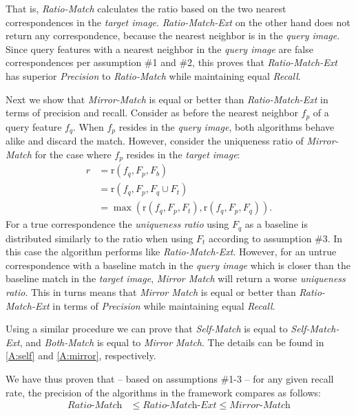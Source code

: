 \documentclass[review]{elsarticle}
\begin{document}
That is, \emph{Ratio-Match} calculates the ratio based on the two nearest correspondences in the \emph{target image}. \emph{Ratio-Match-Ext} on the other hand does not return any correspondence, because the nearest neighbor is in the \emph{query image}. Since query features with a nearest neighbor in the \emph{query image} are false correspondences per assumption \#1 and \#2, this proves that \emph{Ratio-Match-Ext} has superior \emph{Precision} to \emph{Ratio-Match} while maintaining equal \emph{Recall}.

Next we show that \emph{Mirror-Match} is equal or better than \emph{Ratio-Match-Ext} in terms of precision and recall. Consider as before the nearest neighbor $f_{p}$ of a query feature $f_{q}$. When $f_{p}$ resides in the \emph{query image}, both algorithms behave alike and discard the match.  However, consider the uniqueness ratio of \emph{Mirror-Match} for the case where $f_{p}$ resides in the \emph{target image}:
\begin{align*}
    r &= \text{r}(f_{q}, F_{p}, F_{b}) \\
        &= \text{r}(f_{q}, F_{p}, F_{q} \cup F_{t})\\
        &= \max( \text{r}(f_{q}, F_{p}, F_{t}), 
    \text{r}(f_{q}, F_{p}, F_{q}) ).
\end{align*}
For a true correspondence the \emph{uniqueness ratio} using $F_{q}$ as a baseline is distributed similarly to the ratio when using $F_{t}$ according to assumption \#3. In this case the algorithm performs like \emph{Ratio-Match-Ext}.  However, for an untrue correspondence with a baseline match in the \emph{query image} which is closer than the baseline match in the \emph{target image}, \emph{Mirror Match} will return a worse \emph{uniqueness ratio}. This in turns means that \emph{Mirror Match} is equal or better than \emph{Ratio-Match-Ext} in terms of  \emph{Precision} while maintaining equal \emph{Recall}.

Using a similar procedure we can prove that \emph{Self-Match} is equal to \emph{Self-Match-Ext}, and \emph{Both-Match} is equal to \emph{Mirror Match}.  The details can be found in \ref{A:self} and \ref{A:mirror}, respectively.

We have thus proven that -- based on assumptions \#1-3 -- for any given recall rate, the precision of the algorithms in the framework compares as follows: 
\begin{align*}
    \textit{Ratio-Match} &\leq \textit{Ratio-Match-Ext} \leq 
    \textit{Mirror-Match}
\end{align*}
\end{document}
